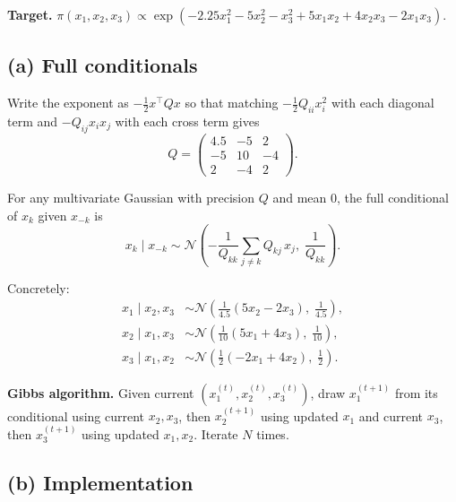\documentclass[
  letterpaper,
  DIV=11,
  numbers=noendperiod]{scrartcl}
\begin{document}
\textbf{Target.}
\(\pi(x_1, x_2, x_3) \propto \exp(-2.25 x_1^2 - 5 x_2^2 - x_3^2 + 5 x_1 x_2 + 4 x_2 x_3 - 2 x_1 x_3)\).

\subsection{(a) Full conditionals}\label{a-full-conditionals}

Write the exponent as \(-\tfrac{1}{2} x^\top Q x\) so that matching
\(-\tfrac{1}{2} Q_{ii} x_i^2\) with each diagonal term and
\(-Q_{ij} x_i x_j\) with each cross term gives \[
Q = \begin{pmatrix} 4.5 & -5 & 2 \\ -5 & 10 & -4 \\ 2 & -4 & 2 \end{pmatrix}.
\]

For any multivariate Gaussian with precision \(Q\) and mean \(0\), the
full conditional of \(x_k\) given \(x_{-k}\) is \[
x_k \mid x_{-k} \sim \mathcal N\!\left(-\frac{1}{Q_{kk}} \sum_{j\neq k} Q_{kj}\, x_j,\; \frac{1}{Q_{kk}}\right).
\]

Concretely: \[
\begin{aligned}
x_1 \mid x_2, x_3 &\sim \mathcal{N}\!\left(\tfrac{1}{4.5}(5 x_2 - 2 x_3),\; \tfrac{1}{4.5}\right),\\
x_2 \mid x_1, x_3 &\sim \mathcal{N}\!\left(\tfrac{1}{10}(5 x_1 + 4 x_3),\; \tfrac{1}{10}\right),\\
x_3 \mid x_1, x_2 &\sim \mathcal{N}\!\left(\tfrac{1}{2}(-2 x_1 + 4 x_2),\; \tfrac{1}{2}\right).
\end{aligned}
\]

\textbf{Gibbs algorithm.} Given current
\((x_1^{(t)}, x_2^{(t)}, x_3^{(t)})\), draw \(x_1^{(t+1)}\) from its
conditional using current \(x_2, x_3\), then \(x_2^{(t+1)}\) using
updated \(x_1\) and current \(x_3\), then \(x_3^{(t+1)}\) using updated
\(x_1, x_2\). Iterate \(N\) times.

\subsection{(b) Implementation}\label{b-implementation}
\end{document}
